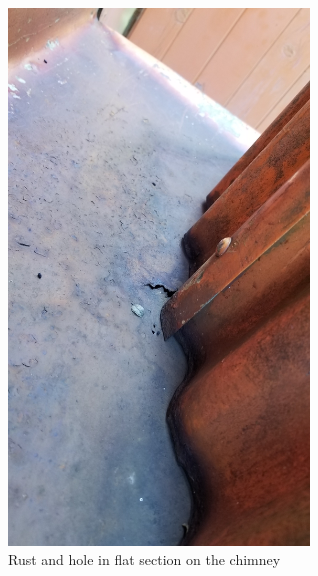 \documentclass[12pt]{article} %
\begin{document}
\begin{figure}[ht]
\begin{minipage}{.5\linewidth}
\begin{center}
   \includegraphics[width=8cm]{LucretiaBivReport23Nov2019Photo4}
   \caption{Rust and hole in flat section on the chimney}
   \label{LB04}
\end{center}
\end{minipage}
\end{figure}
\end{document}
